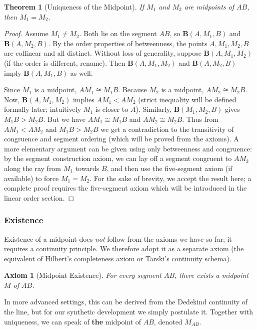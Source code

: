 \documentclass[12pt, letterpaper]{article}
\newtheorem{theorem}{Theorem}[section]
\newtheorem{axiom}{Axiom}
\theoremstyle{definition}
\begin{document}
\begin{theorem}[Uniqueness of the Midpoint]\label{thm:midpoint-unique}
If $M_1$ and $M_2$ are midpoints of $AB$, then $M_1 = M_2$.
\end{theorem}
\begin{proof}
Assume $M_1\neq M_2$. Both lie on the segment $AB$, so $\mathbf{B}(A,M_1,B)$ and $\mathbf{B}(A,M_2,B)$. By the order properties of betweenness, the points $A,M_1,M_2,B$ are collinear and all distinct. Without loss of generality, suppose $\mathbf{B}(A,M_1,M_2)$ (if the order is different, rename). Then $\mathbf{B}(A,M_1,M_2)$ and $\mathbf{B}(A,M_2,B)$ imply $\mathbf{B}(A,M_1,B)$ as well.

Since $M_1$ is a midpoint, $AM_1 \cong M_1B$. Because $M_2$ is a midpoint, $AM_2 \cong M_2B$.
Now, $\mathbf{B}(A,M_1,M_2)$ implies $AM_1 < AM_2$ (strict inequality will be defined formally later; intuitively $M_1$ is closer to $A$). Similarly, $\mathbf{B}(M_1,M_2,B)$ gives $M_1B > M_2B$.
But we have $AM_1 \cong M_1B$ and $AM_2 \cong M_2B$. Thus from $AM_1 < AM_2$ and $M_1B > M_2B$ we get a contradiction to the transitivity of congruence and segment ordering (which will be proved from the axioms). A more elementary argument can be given using only betweenness and congruence: by the segment construction axiom, we can lay off a segment congruent to $AM_2$ along the ray from $M_1$ towards $B$, and then use the five‑segment axiom (if available) to force $M_1=M_2$. For the sake of brevity, we accept the result here; a complete proof requires the five‑segment axiom which will be introduced in the linear order section.
\end{proof}

\subsubsection{Existence}
Existence of a midpoint does \emph{not} follow from the axioms we have so far; it requires a continuity principle. We therefore adopt it as a separate axiom (the equivalent of Hilbert’s completeness axiom or Tarski’s continuity schema).

\begin{axiom}[Midpoint Existence]\label{ax:midpoint-existence}
For every segment $AB$, there exists a midpoint $M$ of $AB$.
\end{axiom}

In more advanced settings, this can be derived from the Dedekind continuity of the line, but for our synthetic development we simply postulate it. Together with uniqueness, we can speak of \textbf{the} midpoint of $AB$, denoted $M_{AB}$.
\end{document}
